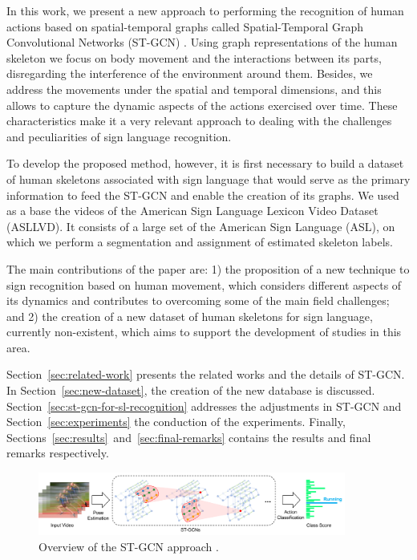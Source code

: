 In this work, we present a new approach to performing the recognition of human actions based on spatial-temporal graphs called Spatial-Temporal Graph Convolutional Networks (ST-GCN) \cite {st-gcn-2018}. Using graph representations of the human skeleton we focus on body movement and the interactions between its parts, disregarding the interference of the environment around them. Besides, we address the movements under the spatial and temporal dimensions, and this allows to capture the dynamic aspects of the actions exercised over time. These characteristics make it a very relevant approach to dealing with the challenges and peculiarities of sign language recognition.

To develop the proposed method, however, it is first necessary to build a dataset of human skeletons associated with sign language that would serve as the primary information to feed the ST-GCN and enable the creation of its graphs. We used as a base the videos of the American Sign Language Lexicon Video Dataset (ASLLVD). It consists of a large set of the American Sign Language (ASL), on which we perform a segmentation and assignment of estimated skeleton labels. 

The main contributions of the paper are: 1) the proposition of a new technique to sign recognition based on human movement, which considers different aspects of its dynamics and contributes to overcoming some of the main field challenges; and 2) the creation of a new dataset of human skeletons for sign language, currently non-existent, which aims to support the development of studies in this area.

Section~\ref{sec:related-work} presents the related works and the details of ST-GCN. In Section~\ref{sec:new-dataset},  the creation of the new database is discussed.
Section~\ref{sec:st-gcn-for-sl-recognition} addresses the adjustments in ST-GCN and Section~\ref{sec:experiments} the conduction of the experiments. Finally, Sections~\ref{sec:results}~and~\ref{sec:final-remarks} contains the results and final remarks respectively.

\begin{figure}[!ht]
    \centering
    \includegraphics[width=0.9\textwidth]{images/st_gcn_workflow}
    \caption{Overview of the ST-GCN approach \cite[p. 3]{st-gcn-2018}.}
    \label{fig:st-gcn-workflow}
\end{figure}


